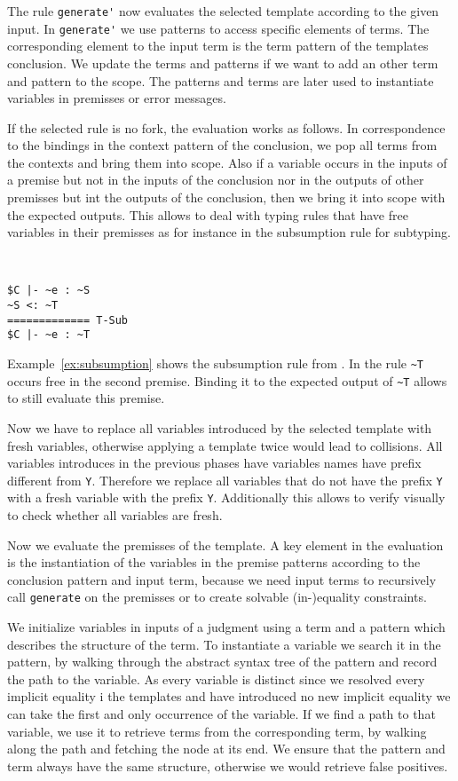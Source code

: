 The rule \verb|generate'| now evaluates the selected template
according to the given input. In \verb|generate'| we use patterns to
access specific elements of terms. The corresponding element to the
input term is the term pattern of the templates conclusion. We update
the terms and patterns if we want to add an other term and pattern to
the scope. The patterns and terms are later used to instantiate
variables in premisses or error messages.

If the selected rule is no fork, the evaluation works as follows. In
correspondence to the bindings in the context pattern of the
conclusion, we pop all terms from the contexts and bring them into
scope. Also if a variable occurs in the inputs of a premise but not in
the inputs of the conclusion nor in the outputs of other premisses but
int the outputs of the conclusion, then we bring it into scope with
the expected outputs. This allows to deal with typing rules that have
free variables in their premisses as for instance in the subsumption
rule for subtyping.

\begin{example}{~}
\begin{lstlisting}[language=sltc]
$C |- ~e : ~S
~S <: ~T
============= T-Sub
$C |- ~e : ~T
\end{lstlisting}
\label{ex:subsumption}
\end{example}

Example~\ref{ex:subsumption} shows the subsumption rule from
. In the rule \verb|~T| occurs free in the second
premise. Binding it to the expected output of \verb|~T| allows to
still evaluate this premise.

Now we have to replace all variables introduced by the selected
template with fresh variables, otherwise applying a template twice
would lead to collisions. All variables introduces in the previous
phases have variables names have prefix different from
\verb|Y|. Therefore we replace all variables that do not have the
prefix \verb|Y| with a fresh variable with the prefix
\verb|Y|. Additionally this allows to verify visually to check whether
all variables are fresh.

Now we evaluate the premisses of the template. A key element in the
evaluation is the instantiation of the variables in the premise
patterns according to the conclusion pattern and input term, because
we need input terms to recursively call \verb|generate| on the
premisses or to create solvable (in-)equality constraints.

We initialize variables in inputs of a judgment using a term and a
pattern which describes the structure of the term. To instantiate a
variable we search it in the pattern, by walking through the abstract
syntax tree of the pattern and record the path to the variable. As
every variable is distinct since we resolved every implicit equality i
the templates and have introduced no new implicit equality we can take
the first and only occurrence of the variable. If we find a path to
that variable, we use it to retrieve terms from the corresponding
term, by walking along the path and fetching the node at its end. We
ensure that the pattern and term always have the same structure,
otherwise we would retrieve false positives.

